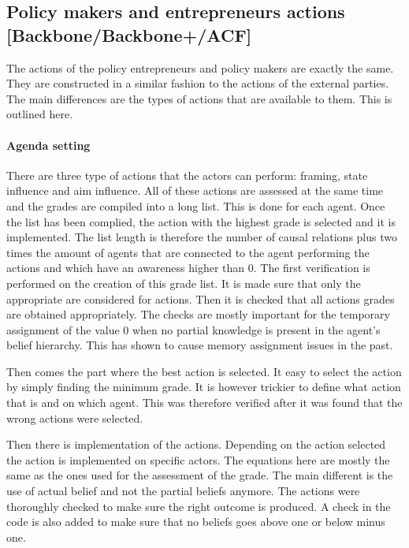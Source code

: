 \subsection{Policy makers and entrepreneurs actions [Backbone/Backbone+/ACF]}

The actions of the policy entrepreneurs and policy makers are exactly the same. They are constructed in a similar fashion to the actions of the external parties. The main differences are the types of actions that are available to them. This is outlined here.

%
\paragraph{Agenda setting}

There are three type of actions that the actors can perform: framing, state influence and aim influence. All of these actions are assessed at the same time and the grades are compiled into a long list. This is done for each agent. Once the list has been complied, the action with the highest grade is selected and it is implemented. The list length is therefore the number of causal relations plus two times the amount of agents that are connected to the agent performing the actions and which have an awareness higher than 0. The first verification is performed on the creation of this grade list. It is made sure that only the appropriate are considered for actions. Then it is checked that all actions grades are obtained appropriately. The checks are mostly important for the temporary assignment of the value 0 when no partial knowledge is present in the agent’s belief hierarchy. This has shown to cause memory assignment issues in the past.

Then comes the part where the best action is selected. It easy to select the action by simply finding the minimum grade. It is however trickier to define what action that is and on which agent. This was therefore verified after it was found that the wrong actions were selected. 

Then there is implementation of the actions. Depending on the action selected the action is implemented on specific actors. The equations here are mostly the same as the ones used for the assessment of the grade. The main different is the use of actual belief and not the partial beliefs anymore. The actions were thoroughly checked to make sure the right outcome is produced. A check in the code is also added to make sure that no beliefs goes above one or below minus one.

